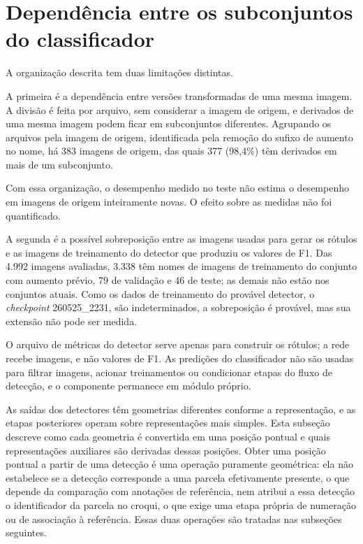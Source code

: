 \section{Depend\^encia entre os subconjuntos do classificador}
\label{sec:dependencia-subconjuntos-classificador}

A organiza\c{c}\~ao descrita tem duas limita\c{c}\~oes distintas.

A primeira \'e a depend\^encia entre vers\~oes transformadas de uma mesma imagem. A divis\~ao \'e feita por arquivo, sem considerar a imagem de origem, e derivados de uma mesma imagem podem ficar em subconjuntos diferentes. Agrupando os arquivos pela imagem de origem, identificada pela remo\c{c}\~ao do sufixo de aumento no nome, h\'a 383 imagens de origem, das quais 377 (98,4\%) t\^em derivados em mais de um subconjunto.

Com essa organiza\c{c}\~ao, o desempenho medido no teste n\~ao estima o desempenho em imagens de origem inteiramente novas. O efeito sobre as medidas n\~ao foi quantificado.

A segunda \'e a poss\'ivel sobreposi\c{c}\~ao entre as imagens usadas para gerar os r\'otulos e as imagens de treinamento do detector que produziu os valores de F1. Das 4.992 imagens avaliadas, 3.338 t\^em nomes de imagens de treinamento do conjunto com aumento pr\'evio, 79 de valida\c{c}\~ao e 46 de teste; as demais n\~ao est\~ao nos conjuntos atuais. Como os dados de treinamento do prov\'avel detector, o \textit{checkpoint} 260525\_2231, s\~ao indeterminados, a sobreposi\c{c}\~ao \'e prov\'avel, mas sua extens\~ao n\~ao pode ser medida.

O arquivo de m\'etricas do detector serve apenas para construir os r\'otulos; a rede recebe imagens, e n\~ao valores de F1. As predi\c{c}\~oes do classificador n\~ao s\~ao usadas para filtrar imagens, acionar treinamentos ou condicionar etapas do fluxo de detec\c{c}\~ao, e o componente permanece em m\'odulo pr\'oprio.

As sa\'idas dos detectores t\^em geometrias diferentes conforme a representa\c{c}\~ao, e as etapas posteriores operam sobre representa\c{c}\~oes mais simples. Esta subse\c{c}\~ao descreve como cada geometria \'e convertida em uma posi\c{c}\~ao pontual e quais representa\c{c}\~oes auxiliares s\~ao derivadas dessas posi\c{c}\~oes. Obter uma posi\c{c}\~ao pontual a partir de uma detec\c{c}\~ao \'e uma opera\c{c}\~ao puramente geom\'etrica: ela n\~ao estabelece se a detec\c{c}\~ao corresponde a uma parcela efetivamente presente, o que depende da compara\c{c}\~ao com anota\c{c}\~oes de refer\^encia, nem atribui a essa detec\c{c}\~ao o identificador da parcela no croqui, o que exige uma etapa pr\'opria de numera\c{c}\~ao ou de associa\c{c}\~ao \`a refer\^encia. Essas duas opera\c{c}\~oes s\~ao tratadas nas subse\c{c}\~oes seguintes.

